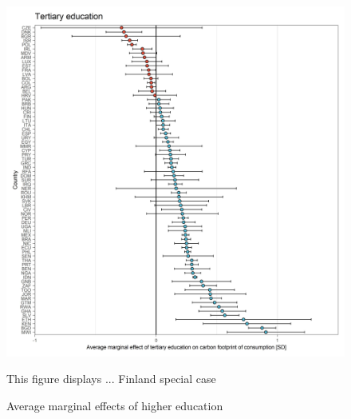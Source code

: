 \documentclass[12pt, a4paper]{article}
\newenvironment{subcaption}
{\strut
\vspace{-5pt}
\begin{minipage}[b]{0.9\textwidth}
  \hspace*{-\parindent}
  \footnotesize}
 {\end{minipage}}
\begin{document}
\begin{figure}[ht!]
  \centering
 \caption{Average marginal effects of higher education} \label{fig:D11_high_edu}
  \includegraphics{Analysis_OLS_ME_Carbon_Footprint/AME_OLS_FP_higher_education}
  \begin{subcaption}
    This figure displays ... Finland special case
  \end{subcaption}

\end{figure}

\clearpage
\end{document}
